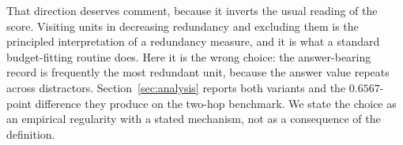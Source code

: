That direction deserves comment, because it inverts the usual reading of the score. Visiting
units in decreasing redundancy and excluding them is the principled interpretation of a
redundancy measure, and it is what a standard budget-fitting routine does. Here it is the
wrong choice: the answer-bearing record is frequently the most redundant unit, because the
answer value repeats across distractors. Section~\ref{sec:analysis} reports both variants
and the $0.6567$-point difference they produce on the two-hop benchmark. We state the choice
as an empirical regularity with a stated mechanism, not as a consequence of the definition.
